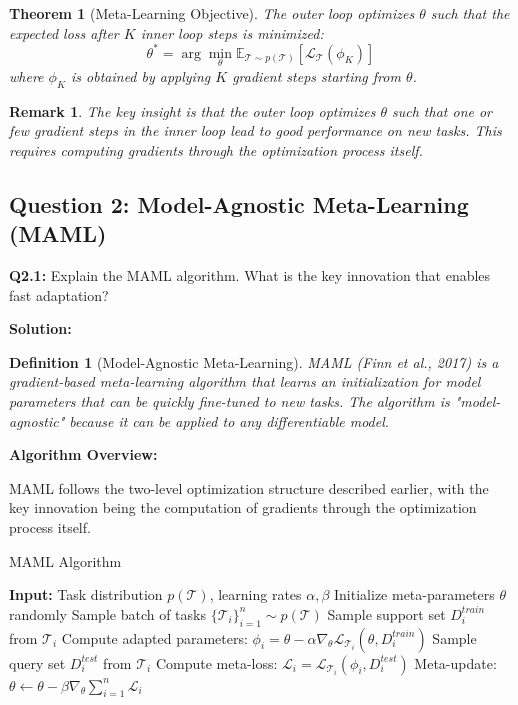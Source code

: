 \documentclass[12pt]{article}
\newcommand{\ieee}[1]{\textcolor{IEEEBlue}{\textbf{#1}}}
\newtheorem{theorem}{Theorem}
\newtheorem{definition}{Definition}
\newtheorem{remark}{Remark}
\begin{document}
{{			\begin{theorem}[Meta-Learning Objective]
			The outer loop optimizes $\theta$ such that the expected loss after $K$ inner loop steps is minimized:
			\begin{equation}
			\theta^* = \arg\min_\theta \mathbb{E}_{\mathcal{T} \sim p(\mathcal{T})} \left[ \mathcal{L}_{\mathcal{T}}(\phi_K) \right]
			\end{equation}
			where $\phi_K$ is obtained by applying $K$ gradient steps starting from $\theta$.
			\end{theorem}
			
			\begin{remark}
			The key insight is that the outer loop optimizes $\theta$ such that one or few gradient steps in the inner loop lead to good performance on new tasks. This requires computing gradients through the optimization process itself.
			\end{remark}
			
			\subsection{Question 2: Model-Agnostic Meta-Learning (MAML)}
			
			\textbf{Q2.1:} Explain the MAML algorithm. What is the key innovation that enables fast adaptation?
			
			\textbf{Solution:}
			
			\begin{definition}[Model-Agnostic Meta-Learning]
			MAML (Finn et al., 2017) is a gradient-based meta-learning algorithm that learns an initialization for model parameters that can be quickly fine-tuned to new tasks. The algorithm is "model-agnostic" because it can be applied to any differentiable model.
			\end{definition}
			
			\ieee{Algorithm Overview:}
			
			MAML follows the two-level optimization structure described earlier, with the key innovation being the computation of gradients through the optimization process itself.
			
			\begin{algorithm}[H]
			\caption{MAML Algorithm}
			\begin{algorithmic}[1]
			\STATE \textbf{Input:} Task distribution $p(\mathcal{T})$, learning rates $\alpha, \beta$
			\STATE Initialize meta-parameters $\theta$ randomly
			\STATE Sample batch of tasks $\{\mathcal{T}_i\}_{i=1}^n \sim p(\mathcal{T})$
			\STATE Sample support set $D_i^{train}$ from $\mathcal{T}_i$
			\STATE Compute adapted parameters: $\phi_i = \theta - \alpha\nabla_\theta \mathcal{L}_{\mathcal{T}_i}(\theta, D_i^{train})$
			\STATE Sample query set $D_i^{test}$ from $\mathcal{T}_i$
			\STATE Compute meta-loss: $\mathcal{L}_i = \mathcal{L}_{\mathcal{T}_i}(\phi_i, D_i^{test})$
			\ENDFOR
			\STATE Meta-update: $\theta \leftarrow \theta - \beta\nabla_\theta \sum_{i=1}^n \mathcal{L}_i$
			\ENDWHILE
			\end{algorithmic}
			\end{algorithm}
			
}}
\end{document}
